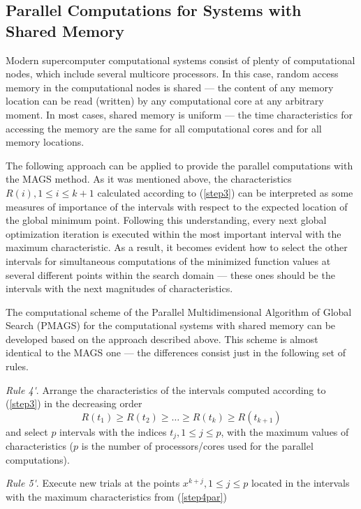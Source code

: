\documentclass{aims}
\theoremstyle{definition}
\begin{document}
\subsection{Parallel Computations for Systems with Shared Memory}
\label{subsec:sharedpar}
Modern supercomputer computational systems consist of plenty of computational nodes,
which include several multicore processors. In this case, random access memory
in the computational nodes is shared --- the content of any memory location can be read
(written) by any computational core at any arbitrary moment. In most cases, shared memory is
uniform --- the time characteristics for accessing the memory are the same for all
computational cores and for all memory locations.
\par
The following approach can be applied to provide the parallel computations with the MAGS method.
As it was mentioned above, the characteristics \(R(i),1\leq i\leq k+1\) calculated
according to (\ref{step3}) can be interpreted as some measures of importance of the
intervals with respect to the expected location of the global minimum point.
Following this understanding, every next global optimization iteration is executed within
the most important interval with the maximum characteristic. As a result, it becomes
evident how to select the other intervals for simultaneous computations of the minimized
function values at several different points within the search domain --- these ones
should be the intervals with the next magnitudes of characteristics.
\par
The computational scheme of the Parallel Multidimensional Algorithm of Global Search (PMAGS)
for the computational systems with shared memory can be developed based on the approach
described above. This scheme is almost identical to the MAGS one --- the differences
consist just in the following set of rules.
\par
\textit{Rule 4\'}. Arrange the characteristics of the intervals computed according to (\ref{step3}) in the decreasing order
\begin{equation}
\label{step4par}
R(t_1)\geq R(t_2)\geq \dots \geq R(t_{k})\geq R(t_{k+1})
\end{equation}
and select \(p\) intervals with the indices \(t_j,1\leq j\leq p\), with the maximum
values of characteristics (\(p\) is the number of processors/cores used for the parallel computations).
\par
\textit{Rule 5\'}. Execute new trials at the points \(x^{k+j},1\leq j\leq p\) located
in the intervals with the maximum characteristics from (\ref{step4par})
\end{document}
